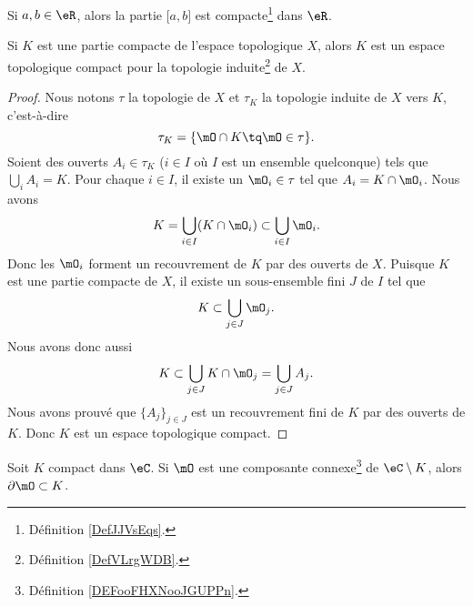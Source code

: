 \begin{lemma}       \label{LEMooNNHYooITNbyz}
	Si \( a,b\in \eR\), alors la partie \( \mathopen[ a , b \mathclose]\) est compacte\footnote{Définition \ref{DefJJVsEqs}.} dans \( \eR\).
\end{lemma}

\begin{lemma}       \label{LEMooVYTRooKTIYdn}
	Si \( K\) est une partie compacte de l'espace topologique \( X\), alors \( K\) est un espace topologique compact pour la topologie induite\footnote{Définition \ref{DefVLrgWDB}.} de \( X\).
\end{lemma}

\begin{proof}
	Nous notons \( \tau\) la topologie de \( X\) et \( \tau_K\) la topologie induite de \( X\) vers \( K\), c'est-à-dire
	\begin{equation}
		\tau_K=\{ \mO\cap K\tq \mO\in\tau \}.
	\end{equation}
	Soient des ouverts \( A_i\in \tau_K\) (\( i\in I\) où \( I\) est un ensemble quelconque) tels que \( \bigcup_iA_i=K\). Pour chaque \( i\in I\), il existe un \( \mO_i\in \tau\) tel que \( A_i=K\cap\mO_i\). Nous avons
	\begin{equation}
		K=\bigcup_{i\in I}(K\cap\mO_i)\subset\bigcup_{i\in I}\mO_i.
	\end{equation}
	Donc les \( \mO_i\) forment un recouvrement de \( K\) par des ouverts de \( X\). Puisque \( K\) est une partie compacte de \( X\), il existe un sous-ensemble fini \( J\) de \( I\) tel que
	\begin{equation}
		K\subset\bigcup_{j\in J}\mO_j.
	\end{equation}
	Nous avons donc aussi
	\begin{equation}
		K\subset\bigcup_{j\in J}K\cap\mO_j=\bigcup_{j\in J}A_j.
	\end{equation}
	Nous avons prouvé que \( \{ A_j \}_{j\in J}\) est un recouvrement fini de \( K\) par des ouverts de \( K\). Donc \( K\) est un espace topologique compact.
\end{proof}

\begin{proposition}       \label{PROPooOXKSooEDzCRZ}
    Soit \( K\) compact dans \( \eC\). Si \( \mO\) est une composante connexe\footnote{Définition \ref{DEFooFHXNooJGUPPn}.} de \( \eC\setminus K\), alors \( \partial \mO\subset K\).
\end{proposition}

